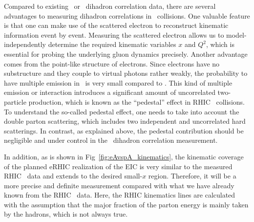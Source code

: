 

Compared to existing \pA\ or \dA\ dihadron correlation data, there are
several advantages to measuring dihadron correlations in \eA\ collisions. 
One valuable feature is that one can make use of the scattered electron to
reconstruct kinematic information event by event. Measuring
the scattered electron allows us to model-independently determine the required
kinematic variables $x$ and $Q^{2}$, which is essential for probing the
underlying gluon dynamics precisely. Another advantage comes from the point-like
structure of electrons. Since electrons have no substructure and they couple to
virtual photons rather weakly, the probability to have multiple emission in \eA\
is very small compared to \pA. This kind of multiple emission or
interaction introduces a significant amount of uncorrelated two-particle production,
which is known as the ``pedestal'' effect in RHIC \dA\ collisions. To understand the
so-called pedestal effect, one needs to take into account the double parton
scattering, which includes two independent and uncorrelated hard scatterings. In
contrast, as explained above, the pedestal contribution should be negligible and
under control in the \eA\ dihadron correlation measurement.

In addition, as is shown in Fig~\ref{fig:eAvspA_kinematics}, the kinematic
coverage of the planned eRHIC realization of the EIC
is very similar to the measured RHIC \dA\ data and
extends to the desired small-$x$ region. Therefore, it will be a more precise and definite
measurement compared with what we have already known from the RHIC \dA\ data.
Here, the RHIC kinematics lines are calculated with the assumption that the major fraction of 
the parton energy is mainly taken by the hadrons, which is not always true.


